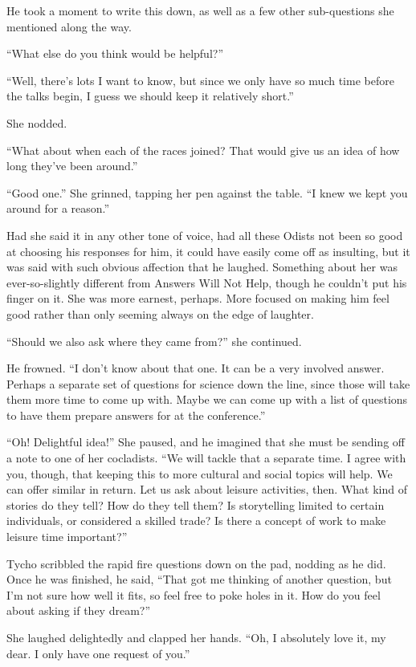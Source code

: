 He took a moment to write this down, as well as a few other sub-questions she mentioned along the way.

``What else do you think would be helpful?''

``Well, there's lots I want to know, but since we only have so much time before the talks begin, I guess we should keep it relatively short.''

She nodded.

``What about when each of the races joined? That would give us an idea of how long they've been around.''

``Good one.'' She grinned, tapping her pen against the table. ``I knew we kept you around for a reason.''

Had she said it in any other tone of voice, had all these Odists not been so good at choosing his responses for him, it could have easily come off as insulting, but it was said with such obvious affection that he laughed. Something about her was ever-so-slightly different from Answers Will Not Help, though he couldn't put his finger on it. She was more earnest, perhaps. More focused on making him feel good rather than only seeming always on the edge of laughter.

``Should we also ask where they came from?'' she continued.

He frowned. ``I don't know about that one. It can be a very involved answer. Perhaps a separate set of questions for science down the line, since those will take them more time to come up with. Maybe we can come up with a list of questions to have them prepare answers for at the conference.''

``Oh! Delightful idea!'' She paused, and he imagined that she must be sending off a note to one of her cocladists. ``We will tackle that a separate time. I agree with you, though, that keeping this to more cultural and social topics will help. We can offer similar in return. Let us ask about leisure activities, then. What kind of stories do they tell? How do they tell them? Is storytelling limited to certain individuals, or considered a skilled trade? Is there a concept of work to make leisure time important?''

Tycho scribbled the rapid fire questions down on the pad, nodding as he did. Once he was finished, he said, ``That got me thinking of another question, but I'm not sure how well it fits, so feel free to poke holes in it. How do you feel about asking if they dream?''

She laughed delightedly and clapped her hands. ``Oh, I absolutely love it, my dear. I only have one request of you.''

